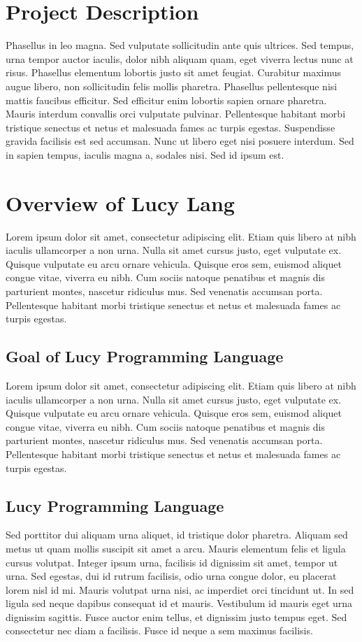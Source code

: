 \section{Project Description}
Phasellus in leo magna. Sed vulputate sollicitudin ante quis ultrices. Sed tempus, urna tempor auctor iaculis, dolor nibh aliquam quam, eget viverra lectus nunc at risus. Phasellus elementum lobortis justo sit amet feugiat. Curabitur maximus augue libero, non sollicitudin felis mollis pharetra. Phasellus pellentesque nisi mattis faucibus efficitur. Sed efficitur enim lobortis sapien ornare pharetra. Mauris interdum convallis orci vulputate pulvinar. Pellentesque habitant morbi tristique senectus et netus et malesuada fames ac turpis egestas. Suspendisse gravida facilisis est sed accumsan. Nunc ut libero eget nisi posuere interdum. Sed in sapien tempus, iaculis magna a, sodales nisi. Sed id ipsum est.


\section{Overview of Lucy Lang}
Lorem ipsum dolor sit amet, consectetur adipiscing elit. Etiam quis libero at nibh iaculis ullamcorper a non urna. Nulla sit amet cursus justo, eget vulputate ex. Quisque vulputate eu arcu ornare vehicula. Quisque eros sem, euismod aliquet congue vitae, viverra eu nibh. Cum sociis natoque penatibus et magnis dis parturient montes, nascetur ridiculus mus. Sed venenatis accumsan porta. Pellentesque habitant morbi tristique senectus et netus et malesuada fames ac turpis egestas.


\subsection{Goal of Lucy Programming Language}
Lorem ipsum dolor sit amet, consectetur adipiscing elit. Etiam quis libero at nibh iaculis ullamcorper a non urna. Nulla sit amet cursus justo, eget vulputate ex. Quisque vulputate eu arcu ornare vehicula. Quisque eros sem, euismod aliquet congue vitae, viverra eu nibh. Cum sociis natoque penatibus et magnis dis parturient montes, nascetur ridiculus mus. Sed venenatis accumsan porta. Pellentesque habitant morbi tristique senectus et netus et malesuada fames ac turpis egestas.


\subsection{Lucy Programming Language}
Sed porttitor dui aliquam urna aliquet, id tristique dolor pharetra. Aliquam sed metus ut quam mollis suscipit sit amet a arcu. Mauris elementum felis et ligula cursus volutpat. Integer ipsum urna, facilisis id dignissim sit amet, tempor ut urna. Sed egestas, dui id rutrum facilisis, odio urna congue dolor, eu placerat lorem nisl id mi. Mauris volutpat urna nisi, ac imperdiet orci tincidunt ut. In sed ligula sed neque dapibus consequat id et mauris. Vestibulum id mauris eget urna dignissim sagittis. Fusce auctor enim tellus, et dignissim justo tempus eget. Sed consectetur nec diam a facilisis. Fusce id neque a sem maximus facilisis.


